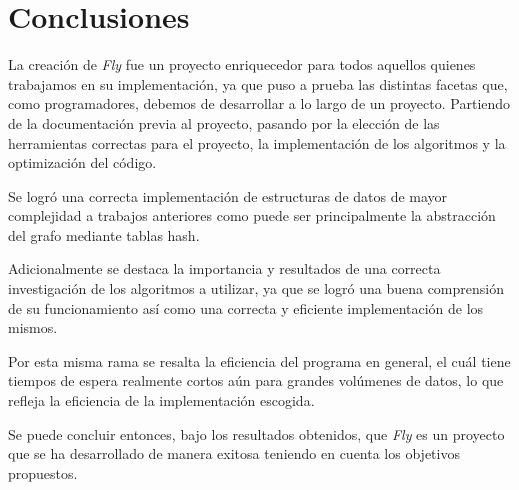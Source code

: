 \section{Conclusiones}

La creación de \textit{Fly} fue un proyecto enriquecedor para todos aquellos quienes trabajamos en su implementación, ya que puso a prueba las distintas facetas que, como programadores, debemos de desarrollar a lo largo de un proyecto. Partiendo de la documentación previa al proyecto, pasando por la elección de las herramientas correctas para el proyecto, la implementación de los algoritmos y la optimización del código.

Se logró una correcta implementación de estructuras de datos de mayor complejidad a trabajos anteriores como puede ser principalmente la abstracción del grafo mediante tablas hash.

Adicionalmente se destaca la importancia y resultados de una correcta investigación de los algoritmos a utilizar, ya que se logró una buena comprensión de su funcionamiento así como una correcta y eficiente implementación de los mismos.

Por esta misma rama se resalta la eficiencia del programa en general, el cuál tiene tiempos de espera realmente cortos aún para grandes volúmenes de datos, lo que refleja la eficiencia de la implementación escogida.

Se puede concluir entonces, bajo los resultados obtenidos, que \textit{Fly} es un proyecto que se ha desarrollado de manera exitosa teniendo en cuenta los objetivos propuestos.